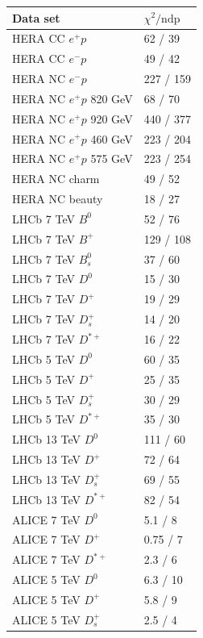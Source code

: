 \documentclass[12pt]{article}
\begin{document}
\begin{table}
\renewcommand*{\arraystretch}{1.12}
    \centering
\begin{tabular}{ll}
    Data set & $\chi^2/\textrm{ndp}$ \\
    \hline
    HERA CC $e^{+}p$ & 62 / 39  \\ 
    HERA CC $e^{-}p$ & 49 / 42  \\ 
    HERA NC $e^{-}p$ & 227 / 159  \\ 
    HERA NC $e^{+}p$ 820 GeV & 68 / 70  \\ 
    HERA NC $e^{+}p$ 920 GeV & 440 / 377  \\ 
    HERA NC $e^{+}p$ 460 GeV & 223 / 204  \\ 
    HERA NC $e^{+}p$ 575 GeV & 223 / 254  \\ 
    HERA NC charm & 49 / 52  \\ 
    HERA NC beauty & 18 / 27  \\ 
    LHCb 7 TeV $B^0$ & 52 / 76  \\ 
    LHCb 7 TeV $B^{+}$ & 129 / 108  \\ 
    LHCb 7 TeV $B^{0}_s$ & 37 / 60  \\ 
    LHCb 7 TeV $D^0$ & 15 / 30  \\ 
    LHCb 7 TeV $D^{+}$ & 19 / 29  \\ 
    LHCb 7 TeV $D^{+}_{s}$ & 14 / 20  \\ 
    LHCb 7 TeV $D^{*+}$ & 16 / 22  \\ 
    LHCb 5 TeV $D^0$ & 60 / 35  \\ 
    LHCb 5 TeV $D^{+}$ & 25 / 35  \\ 
    LHCb 5 TeV $D^{+}_{s}$ & 30 / 29  \\ 
    LHCb 5 TeV $D^{*+}$ & 35 / 30  \\ 
    LHCb 13 TeV $D^0$ & 111 / 60  \\ 
    LHCb 13 TeV $D^{+}$ & 72 / 64  \\ 
    LHCb 13 TeV $D^{+}_{s}$ & 69 / 55  \\ 
    LHCb 13 TeV $D^{*+}$ & 82 / 54  \\ 
    ALICE 7 TeV $D^0$ & 5.1 / 8  \\ 
    ALICE 7 TeV $D^{+}$ & 0.75 / 7  \\ 
    ALICE 7 TeV $D^{*+}$ & 2.3 / 6  \\ 
    ALICE 5 TeV $D^0$ & 6.3 / 10  \\ 
    ALICE 5 TeV $D^{+}$ & 5.8 / 9  \\ 
    ALICE 5 TeV $D^{+}_{s}$ & 2.5 / 4  \\ 

\end{tabular}
\end{table}
\end{document}
